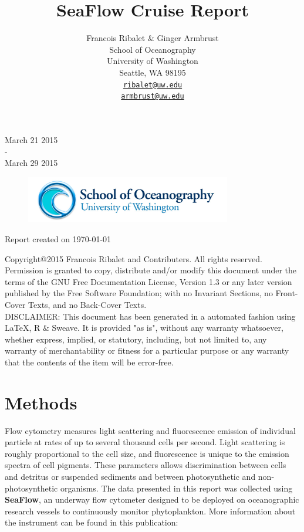 \documentclass[a4paper]{article}
\title{ \Huge SeaFlow Cruise Report}
\author{
       Francois Ribalet \& Ginger Armbrust\\
       School of Oceanography\\
       University of Washington\\
       Seattle, WA 98195\\
 \href{mailto:ribalet@uw.edu}{\texttt{ribalet@uw.edu}}\\
 \href{mailto:armbrust@uw.edu}{\texttt{armbrust@uw.edu}}
 \date{}
}
\begin{document}

\maketitle

\vspace{20 mm}

\begin{center}
\large March 21 2015 \\
 -\\
\large  March 29 2015
 \end{center}

\vspace{20 mm}

\begin{figure}[h]
\centering
\includegraphics[width=0.8\textwidth]{logo.jpg}
\end{figure}		

\vspace{20 mm}

\begin{center}
Report created on \today
 \end{center}


\newpage
Copyright@2015 Francois Ribalet and Contributers. All rights reserved.
Permission is granted to copy, distribute and/or modify this document under the terms of the GNU Free Documentation License, Version 1.3 or any later version published by the Free Software Foundation; with no Invariant Sections, no Front-Cover Texts, and no Back-Cover Texts.\\

DISCLAIMER: This document has been generated in a automated fashion using \LaTeX, R \& Sweave. It is provided "as is", without any warranty whatsoever, whether express, implied, or statutory, including, but not limited to, any warranty of merchantability or fitness for a particular purpose or any warranty that the contents of the item will be error-free.

\newpage
\section{Methods}
Flow cytometry measures light scattering and fluorescence emission of individual particle at rates of up to several thousand cells per second. Light scattering is roughly proportional to the cell size, and fluorescence is unique to the emission spectra of cell pigments. These parameters allows discrimination between cells and detritus or suspended sediments and between photosynthetic and non-photosynthetic organisms.
The data presented in this report was collected using  \textbf{SeaFlow}, an underway flow cytometer designed to be deployed on oceanographic research vessels to continuously monitor phytoplankton. More information about the instrument can be found in this publication:
\end{document}
